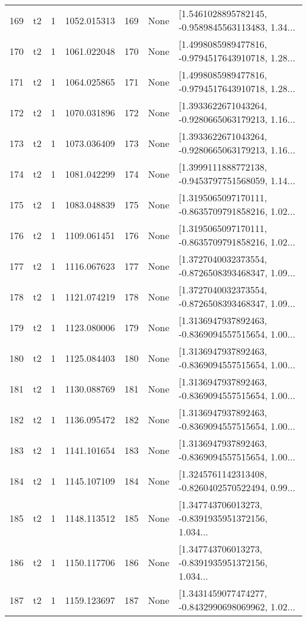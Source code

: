 \begin{tabular}{lllrlll}
169 &  t2 &   1 &  1052.015313 &  169 &  None &  [1.5461028895782145, -0.9589845563113483, 1.34... \\
170 &  t2 &   1 &  1061.022048 &  170 &  None &  [1.4998085989477816, -0.9794517643910718, 1.28... \\
171 &  t2 &   1 &  1064.025865 &  171 &  None &  [1.4998085989477816, -0.9794517643910718, 1.28... \\
172 &  t2 &   1 &  1070.031896 &  172 &  None &  [1.3933622671043264, -0.9280665063179213, 1.16... \\
173 &  t2 &   1 &  1073.036409 &  173 &  None &  [1.3933622671043264, -0.9280665063179213, 1.16... \\
174 &  t2 &   1 &  1081.042299 &  174 &  None &  [1.3999111888772138, -0.9453797751568059, 1.14... \\
175 &  t2 &   1 &  1083.048839 &  175 &  None &  [1.3195065097170111, -0.8635709791858216, 1.02... \\
176 &  t2 &   1 &  1109.061451 &  176 &  None &  [1.3195065097170111, -0.8635709791858216, 1.02... \\
177 &  t2 &   1 &  1116.067623 &  177 &  None &  [1.3727040032373554, -0.8726508393468347, 1.09... \\
178 &  t2 &   1 &  1121.074219 &  178 &  None &  [1.3727040032373554, -0.8726508393468347, 1.09... \\
179 &  t2 &   1 &  1123.080006 &  179 &  None &  [1.3136947937892463, -0.8369094557515654, 1.00... \\
180 &  t2 &   1 &  1125.084403 &  180 &  None &  [1.3136947937892463, -0.8369094557515654, 1.00... \\
181 &  t2 &   1 &  1130.088769 &  181 &  None &  [1.3136947937892463, -0.8369094557515654, 1.00... \\
182 &  t2 &   1 &  1136.095472 &  182 &  None &  [1.3136947937892463, -0.8369094557515654, 1.00... \\
183 &  t2 &   1 &  1141.101654 &  183 &  None &  [1.3136947937892463, -0.8369094557515654, 1.00... \\
184 &  t2 &   1 &  1145.107109 &  184 &  None &  [1.3245761142313408, -0.8260402570522494, 0.99... \\
185 &  t2 &   1 &  1148.113512 &  185 &  None &  [1.347743706013273, -0.8391935951372156, 1.034... \\
186 &  t2 &   1 &  1150.117706 &  186 &  None &  [1.347743706013273, -0.8391935951372156, 1.034... \\
187 &  t2 &   1 &  1159.123697 &  187 &  None &  [1.3431459077474277, -0.8432990698069962, 1.02... \\

\end{tabular}
